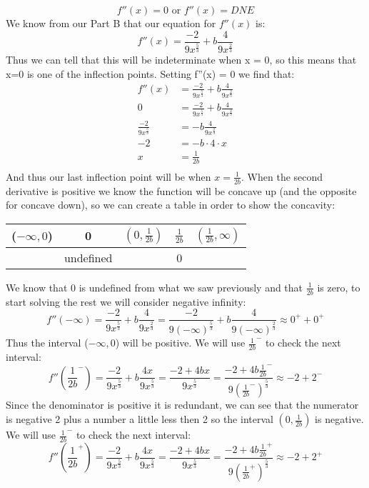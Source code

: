 \documentclass[11pt]{article}
\begin{document}
\[ f''(x) = 0 \text{ or } f''(x) = DNE \]
We know from our Part B that our equation for $f''(x)$ is:
\[ f''(x)  = \frac{-2}{9x^{\frac{5}{3}}} + b\frac{4}{9x^{\frac{2}{3}}}\]
Thus we can tell that this will be indeterminate when x = 0, so this means that x=0 is one of the inflection points. Setting f''(x) = 0 we find that:
\begin{align*}
f''(x) & = \frac{-2}{9x^{\frac{5}{3}}} + b\frac{4}{9x^{\frac{2}{3}}} \\
0 & = \frac{-2}{9x^{\frac{5}{3}}} + b\frac{4}{9x^{\frac{2}{3}}} \\
 \frac{-2}{9x^{\frac{5}{3}}}  & = -b\frac{4}{9x^{\frac{2}{3}}} \\
-2  & = -b\cdot4\cdot x \\
x &= \frac{1}{2b} \\
\end{align*}
And thus our last inflection point will be when $x = \frac{1}{2b}$. When the second derivative is positive we know the function will be concave up (and the opposite for concave down), so we can create a table in order to show the concavity:
\begin{center}
 \begin{tabular}{||c c c c c||} 
 \hline
 ($-\infty, 0$) & 0 & $(0, \frac{1}{2b})$ &  $\frac{1}{2b}$ & $( \frac{1}{2b},\infty)$  \\ [0.5ex] 
 \hline\hline
&  undefined &  & 0 &\\ 
 \hline
\end{tabular}
\end{center}
We know that 0 is undefined from what we saw previously and that $\frac{1}{2b}$ is zero, to start solving the rest we will consider negative infinity:
\[ f''(-\infty) = \frac{-2}{9x^{\frac{5}{3}}} + b\frac{4}{9x^{\frac{2}{3}}} = \frac{-2}{9(-\infty)^{\frac{5}{3}}} + b\frac{4}{9(-\infty)^{\frac{2}{3}}} \approx 0^+ + 0^+\]
Thus the interval  ($-\infty, 0$) will be positive. We will use $\frac{1}{2b}^-$ to check the next interval:
\[ f''(\frac{1}{2b}^-) = \frac{-2}{9x^{\frac{5}{3}}} + b\frac{4x}{9x^{\frac{5}{3}}} = \frac{-2+4bx}{9x^{\frac{5}{3}}} =   \frac{-2+4b\frac{1}{2b}^-}{9(\frac{1}{2b}^-)^{\frac{5}{3}}} \approx -2 + 2^-\]
Since the denominator is positive it is redundant, we can see that the numerator is negative 2 plus a number a little less then 2 so the interval $(0, \frac{1}{2b})$ is negative. We will use $\frac{1}{2b}^-$ to check the next interval:
\[ f''(\frac{1}{2b}^+) = \frac{-2}{9x^{\frac{5}{3}}} + b\frac{4x}{9x^{\frac{5}{3}}} = \frac{-2+4bx}{9x^{\frac{5}{3}}} =   \frac{-2+4b\frac{1}{2b}^+}{9(\frac{1}{2b}^+)^{\frac{5}{3}}} \approx -2 + 2^+\]
\end{document}
